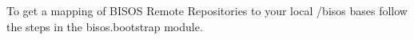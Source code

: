 To get a mapping of BISOS Remote Repositories to your local /bisos
bases follow the steps in the bisos.bootstrap module.





\begin{comment}
*  [[elisp:(org-cycle)][| ]]  [[elisp:(blee:ppmm:org-mode-toggle)][Nat]] [[elisp:(beginning-of-buffer)][Top]] [[elisp:(delete-other-windows)][(1)]] || /DBLOCK: *NO* Table Of Contents/  ::  [[elisp:(org-cycle)][| ]]
\end{comment}




\begin{comment}
*  [[elisp:(org-cycle)][| ]]  Local Vars  ::                  *Org-Mode And Emacs Specific Configurations*   [[elisp:(org-cycle)][| ]]
\end{comment}


\begin{comment}
*  [[elisp:(org-cycle)][| ]]  [[elisp:(blee:ppmm:org-mode-toggle)][Nat]] EndOfFileVars ::  *DBLK: Org-Mode And Emacs Specific Configurations*   [[elisp:(org-cycle)][| ]]
\end{comment}


